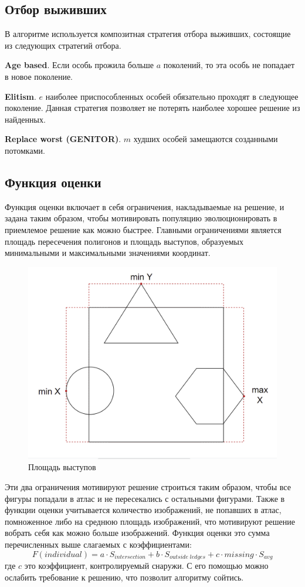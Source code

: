 \documentclass{fefu_thesis/cls/fefu}
\begin{document}
    \subsection{Отбор выживших}
    В алгоритме используется композитная стратегия отбора выживших, состоящие из следующих стратегий отбора.

    \textbf{Age based}. Если особь прожила больше $a$ поколений, то эта особь не попадает в новое поколение.

    \textbf{Elitism}. $e$ наиболее приспособленных особей обязательно проходят в следующее поколение. Данная стратегия позволяет не потерять наиболее хорошее решение из найденных.

    \textbf{Replace worst (GENITOR)}. $m$ худших особей замещаются созданными потомками.
    \subsection{Функция оценки}
    Функция оценки включает в себя ограничения, накладываемые на решение, и задана таким образом, чтобы мотивировать популяцию эволюционировать в приемлемое решение как можно быстрее. Главными ограничениями является площадь пересечения полигонов и площадь выступов, образуемых минимальными и максимальными значениями координат.

    \begin{figure}[H]
        \centering
        \includegraphics[scale=0.5]{images/ledges.png}
        \caption{Площадь выступов}
    \end{figure}

    Эти два ограничения мотивируют решение строиться таким образом, чтобы все фигуры попадали в атлас и не пересекались с остальными фигурами. Также в функции оценки учитывается количество изображений, не попавших в атлас, помноженное либо на среднюю площадь изображений, что мотивируют решение вобрать себя как можно больше изображений. Функция оценки это сумма перечисленных выше слагаемых с коэффициентами:
    \[
        F\left(individual\right) = a \cdot S_{intersection} + b \cdot S_{outside\;ledges} + c \cdot missing \cdot S_{avg}
    \]
    где $c$ это коэффициент, контролируемый снаружи. С его помощью можно ослабить требование к решению, что позволит алгоритму сойтись.
\end{document}
